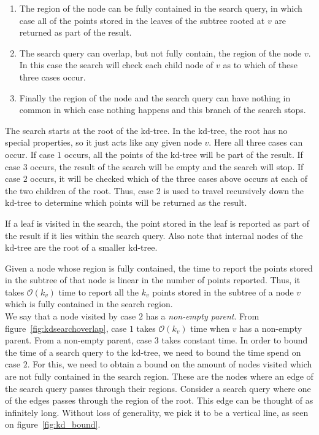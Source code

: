 \begin{enumerate} 
  \item The region of the node can be fully contained in the search query, in which case all of the points stored in the leaves of the subtree rooted at $v$ are returned as part of the result. 
  \item The search query can overlap, but not fully contain, the region of the node $v$. In this case the search will check each child node of $v$ as to which of these three cases occur.
  \item Finally the region of the node and the search query can have nothing in common in which case nothing happens and this branch of the search stops.
\end{enumerate}

The search starts at the root of the kd-tree. In the kd-tree, the root has no special properties, so it just acts like any given node $v$. Here all three cases can occur. If case $1$ occurs, all the points of the kd-tree will be part of the result. If case $3$ occurs, the result of the search will be empty and the search will stop. If case $2$ occurs, it will be checked which of the three cases above occurs at each of the two children of the root. Thus, case 2 is used to travel recursively down the kd-tree to determine which points will be returned as the result.

\noindent If a leaf is visited in the search, the point stored in the leaf is reported as part of the result if it lies within the search query. Also note that internal nodes of the kd-tree are the root of a smaller kd-tree.

Given a node whose region is fully contained, the time to report the points stored in the subtree of that node is linear in the number of points reported. Thus, it takes $\mathcal{O}(k_v)$ time to report all the $k_v$ points stored in the subtree of a node $v$ which is fully contained in the search region. \\

We say that a node visited by case $2$ has a \emph{non-empty parent}. From figure~\ref{fig:kdsearchoverlap}, case $1$ takes $\mathcal{O}(k_v)$ time when $v$ has a non-empty parent. From a non-empty parent, case $3$ takes constant time. In order to bound the time of a search query to the kd-tree, we need to bound the time spend on case $2$. For this, we need to obtain a bound on the amount of nodes visited which are not fully contained in the search region. These are the nodes where an edge of the search query passes through their regions. Consider a search query where one of the edges passes through the region of the root. This edge can be thought of as infinitely long. Without loss of generality, we pick it to be a vertical line, as seen on figure~\ref{fig:kd_bound}. \\

